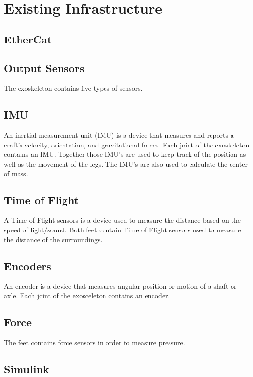 \section{Existing Infrastructure}
\subsection{EtherCat}

\subsection{Output Sensors}
The exoskeleton contains five types of sensors.
\subsection{IMU}
An inertial measurement unit (IMU) is a device that measures and reports a craft's velocity, orientation, and gravitational forces. Each joint of the exoskeleton contains an IMU. Together those IMU's are used to keep track of the position as well as the movement of the legs. The IMU's are also used to calculate the center of mass. 
\subsection{Time of Flight}
A Time of Flight sensors is a device used to measure the distance based on the speed of light/sound. Both feet contain Time of Flight sensors used to measure the distance of the surroundings.
\subsection{Encoders}
An encoder is a device that measures angular position or motion of a shaft or axle. Each joint of the exosceleton contains an encoder. 
\subsection{Force}
The feet contains force sensors in order to measure pressure.

\subsection{Simulink}